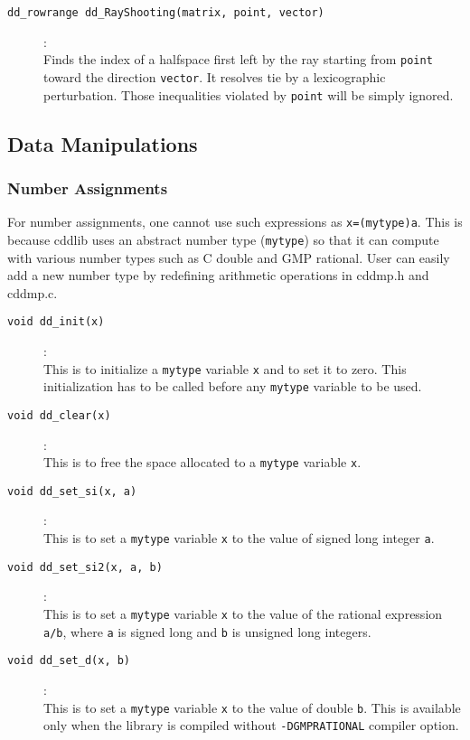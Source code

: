 \documentclass[11pt]{article}
\newcommand {\0} {{\bf 0}}
\begin{document}
\begin{description}
\item[{\tt dd\_rowrange dd\_RayShooting(matrix, point, vector)}]:\\
Finds the index of a halfspace first left by the ray starting from
{\tt point} toward the direction {\tt vector}.  It resolves
tie by a lexicographic perturbation.  Those inequalities violated
by {\tt point} will be simply ignored.

\end{description}


\subsection{Data Manipulations}  \label{DataLibrary}

\subsubsection{Number Assignments}
For number assignments, one cannot use such expressions as {\tt x=(mytype)a}.
This is because cddlib uses an abstract number type ({\tt mytype})
so that it can compute with various
number types such as C double and GMP rational.
User can easily add a new number type by redefining
arithmetic operations in cddmp.h and cddmp.c.

\begin{description}


\item[{\tt void dd\_init(x)}]:\\
This is to initialize a {\tt mytype} variable {\tt x} and to set it
to zero.    This initialization has to be called before
any {\tt mytype} variable to be used.

\item[{\tt void dd\_clear(x)}]:\\
This is to free the space allocated to a {\tt mytype} variable {\tt x}.

\item[{\tt void dd\_set\_si(x, a)}]:\\
This is to set a {\tt mytype} variable {\tt x} to the
value of signed long integer {\tt a}.

\item[{\tt void dd\_set\_si2(x, a, b)}]:\\
This is to set a {\tt mytype} variable {\tt x} to the
value of  the rational expression {\tt a/b}, where
{\tt a} is signed long and  {\tt b} is unsigned long
integers.

\item[{\tt void dd\_set\_d(x, b)}]:\\
This is to set a {\tt mytype} variable {\tt x} to the
value of double {\tt b}.  This is available only
when the library is compiled without {\tt -DGMPRATIONAL}
compiler option.

\end{description}
\end{document}
